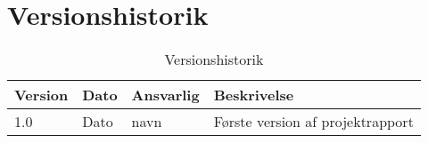 \chapter{Versionshistorik}\label{Versionshistorik}

\begin{table}[htb]
\begin{tabular}{ | l | l | l | p{} | }
\hline
\textbf{Version} & \textbf{Dato} & \textbf{Ansvarlig} & \textbf{Beskrivelse} \\\hline
1.0 & Dato & navn & Første version af projektrapport\\\hline
\end{tabular}
\caption{Versionshistorik}
\end{table}

